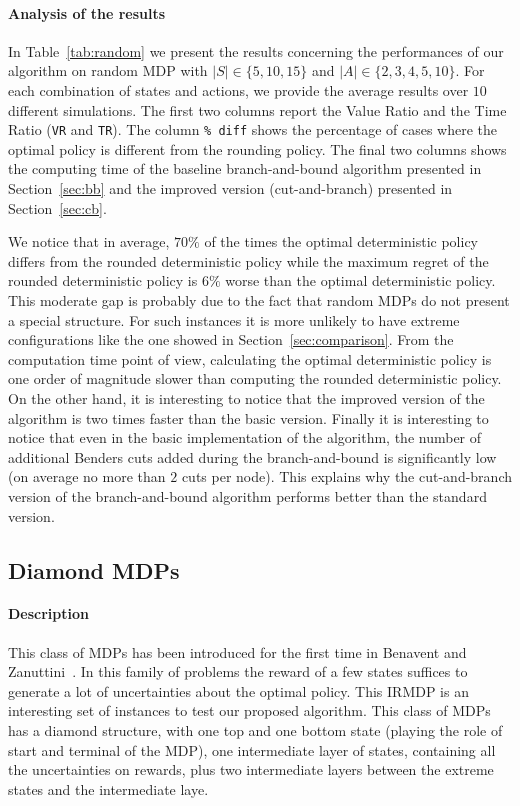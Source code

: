 \paragraph{Analysis of the results}
In Table~\ref{tab:random} we present the results concerning the performances of our algorithm on random MDP with $|S| \in \{5,10,15\}$ and $|A| \in \{2, 3, 4, 5, 10\}$. For each combination of states and actions, we provide the average results over $10$ different simulations. The first two columns report the Value Ratio and the Time Ratio (\texttt{VR} and \texttt{TR}). The column \texttt{\% diff} shows the percentage of cases where the optimal policy is different from the rounding policy. The final two columns shows the computing time of the baseline branch-and-bound algorithm presented in Section~\ref{sec:bb} and the improved version (cut-and-branch) presented in Section~\ref{sec:cb}.

We notice that in average, $70\%$ of the times the optimal deterministic policy differs from the rounded deterministic policy while the maximum regret of the rounded deterministic policy is $6\%$ worse than the optimal deterministic policy. This moderate gap is probably due to the fact that random MDPs do not present a special structure. For such instances it is more unlikely to have extreme configurations like the one showed in Section~\ref{sec:comparison}. From the computation time point of view, calculating the optimal deterministic policy is one order of magnitude slower than computing the rounded deterministic policy. On the other hand, it is interesting to notice that the improved version of the algorithm is two times faster than the basic version.  
Finally it is interesting to notice that even in the basic implementation of the algorithm, the number of additional Benders cuts added during the branch-and-bound is significantly low (on average no more than $2$ cuts per node). This explains why the cut-and-branch version of the branch-and-bound algorithm performs better than the standard version.
  




\subsection{Diamond MDPs}
\paragraph{Description}
This class of MDPs has been introduced for the first time in Benavent and Zanuttini~\cite{benavent2018}. 
In this family of problems the reward of a few states suffices to generate a lot of uncertainties about the optimal policy. This IRMDP is an interesting set of instances to test our proposed algorithm. 
This class of MDPs has a diamond structure, with one top and one bottom state (playing the role of start and terminal of the MDP), one intermediate layer of states, containing all the uncertainties on rewards, plus two intermediate layers between the extreme states and the intermediate laye. 

